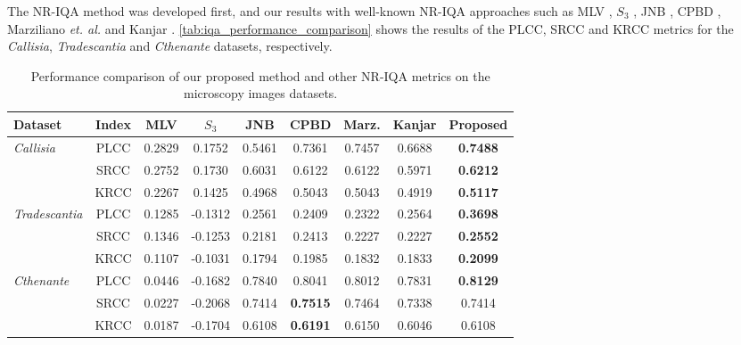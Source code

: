 The NR-IQA method was developed first, and our results with well-known NR-IQA approaches such as MLV \cite{bahrami2014fast}, $S_{3}$ \cite{vu2012s3}, JNB \cite{ferzli2009noreference}, CPBD \cite{narvekar2011noreference}, Marziliano \textit{et. al.} \cite{marziliano2002noreference} and Kanjar \cite{kanjar2013image}. \autoref{tab:iqa_performance_comparison} shows the results of the PLCC, SRCC and KRCC metrics for the \textit{Callisia}, \textit{Tradescantia} and \textit{Cthenante} datasets, respectively.

\begin{table}[ht]
    \centering
    \caption{Performance comparison of our proposed method and other NR-IQA metrics on the microscopy images datasets.}
    \label{tab:iqa_performance_comparison}
    \begin{tabular}{lcccccccc}
        \toprule
        Dataset & Index & MLV & $S_{3}$ & JNB & CPBD & Marz. & Kanjar & \textbf{Proposed}\\
        \midrule
        
        \multirow{3}{*}{\textit{\small Callisia}} 
        & \small PLCC & 0.2829 & 0.1752 & 0.5461 & 0.7361 & 0.7457 & 0.6688 & \textbf{0.7488}\\
        & \small SRCC & 0.2752 & 0.1730 & 0.6031 & 0.6122 & 0.6122 & 0.5971 & \textbf{0.6212}\\
        & \small KRCC & 0.2267 & 0.1425 & 0.4968 & 0.5043 & 0.5043 & 0.4919 & \textbf{0.5117}\\
        
        \midrule
        
        \multirow{3}{*}{\textit{\small Tradescantia}}
        & \small PLCC & 0.1285 & -0.1312 & 0.2561 & 0.2409 & 0.2322 & 0.2564 & \textbf{0.3698}\\
        & \small SRCC & 0.1346 & -0.1253 & 0.2181 & 0.2413 & 0.2227 & 0.2227 & \textbf{0.2552}\\
        & \small KRCC & 0.1107 & -0.1031 & 0.1794 & 0.1985 & 0.1832 & 0.1833 & \textbf{0.2099}\\

        \midrule
        
        \multirow{3}{*}{\textit{\small Cthenante}} 
        & \small PLCC & 0.0446 & -0.1682 & 0.7840 & 0.8041 & 0.8012 & 0.7831 & \textbf{0.8129}\\
        & \small SRCC & 0.0227 & -0.2068 & 0.7414 & \textbf{0.7515} & 0.7464 & 0.7338 & 0.7414\\
        & \small KRCC & 0.0187 & -0.1704 & 0.6108 & \textbf{0.6191} & 0.6150 & 0.6046 & 0.6108\\
        
        \bottomrule
    \end{tabular}
    \centering
    \fautor
\end{table}


